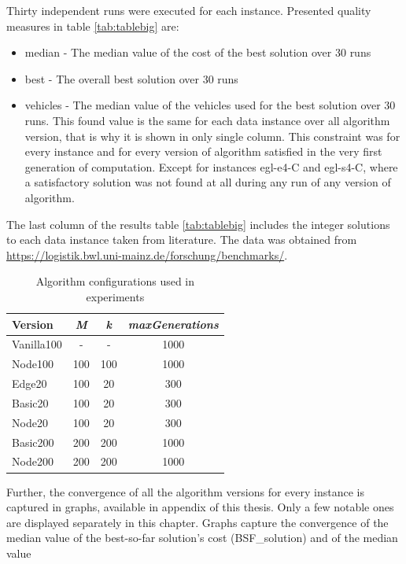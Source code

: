 \documentclass[twoside]{ctuthesis}
\theoremstyle{plain}
\theoremstyle{definition}
\theoremstyle{note}
\begin{document}
Thirty independent runs were executed for each instance. Presented quality measures in table \ref{tab:tablebig} are:
\begin{itemize}
	\item median - The median value of the cost of the best solution over 30 runs 
	\item best - The overall best solution over 30 runs
	\item vehicles - The median value of the vehicles used for the best solution over 30 runs. This found value is the same for each data instance over all algorithm version, that is why it is shown in only single column. This constraint was for every instance and for every version of algorithm satisfied in the very first generation of computation. Except for instances egl-e4-C and egl-s4-C, where a satisfactory solution was not found at all during any run of any version of algorithm.
\end{itemize}
The last column of the results table \ref{tab:tablebig} includes the integer solutions to each data instance taken from literature. The data was obtained from \url{https://logistik.bwl.uni-mainz.de/forschung/benchmarks/}.


\begin{table}[htbp]
	\centering
	\caption{Algorithm configurations used in experiments}
	\label{tab:algorithm-versions}
	\begin{tabular}{|l|c|c|c|}
		\hline
		\textbf{Version} & \textbf{\emph{M}} & \textbf{\emph{k}} & \textbf{\emph{maxGenerations}} \\
		\hline
		Vanilla100 & - & - & 1000 \\
		Node100 & 100 & 100 & 1000 \\
		Edge20 & 100 & 20 & 300 \\
		Basic20 & 100 & 20 & 300 \\
		Node20 & 100 & 20 & 300 \\
		Basic200 & 200 & 200 & 1000 \\
		Node200 & 200 & 200 & 1000 \\
		\hline
	\end{tabular}
\end{table}


Further, the convergence of all the algorithm versions for every instance is captured in graphs, available in appendix of this thesis. Only a few notable ones are displayed separately in this chapter.
Graphs capture the convergence of the median value of the best-so-far solution's cost (BSF\_solution) and of the median value
\end{document}
